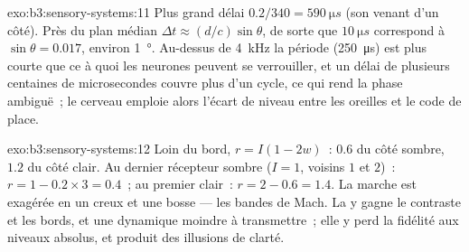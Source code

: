 \begin{solution}{exo:b3:sensory-systems:11}
Plus grand délai $0.2/340 = \qty{590}{\micro s}$ (son venant d'un côté).
Près du plan médian $\Delta t \approx (d/c)\sin\theta$, de sorte que
$\qty{10}{\micro
s}$ correspond à $\sin\theta = 0.017$, environ \qty{1}{\degree}.
Au-dessus de \qty{4}{kHz} la période (\qty{250}{\micro s}) est plus
courte que ce à quoi les neurones peuvent se verrouiller, et un délai de
plusieurs centaines de microsecondes couvre plus d'un cycle, ce qui rend
la phase ambiguë~; le cerveau emploie alors l'écart de niveau entre les
oreilles et le code de place.
\end{solution}

\begin{solution}{exo:b3:sensory-systems:12}
Loin du bord, $r = I(1 - 2w)$~: $0.6$ du côté sombre, $1.2$ du côté
clair. Au dernier récepteur sombre ($I = 1$, voisins $1$ et $2$)~: $r
= 1 - 0.2\times 3 = 0.4$~; au premier clair~: $r = 2 - 0.6 = 1.4$. La
marche est exagérée en un creux et une bosse --- les bandes de Mach. La
 y gagne le contraste et les bords, et une dynamique moindre à
transmettre~; elle y perd la fidélité aux niveaux absolus, et produit
des illusions de clarté.
\end{solution}

